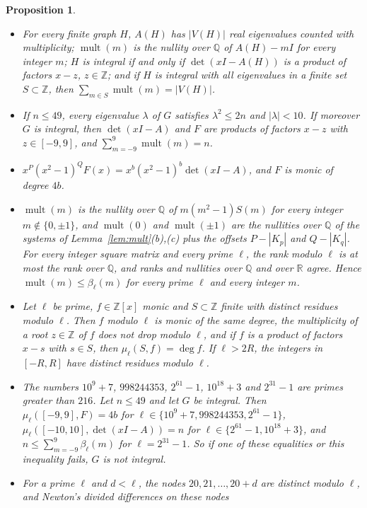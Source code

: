 \documentclass[11pt]{article}
\newtheorem{proposition}[lemma]{Proposition}
\theoremstyle{definition}
\theoremstyle{remark}
\DeclareMathOperator{\mult}{mult}
\newcommand{\Z}{\mathbb Z}
\newcommand{\R}{\mathbb R}
\newcommand{\Q}{\mathbb Q}
\begin{document}
\begin{proposition}\label{prop:tests}
\begin{itemize}
\item[(a)] For every finite graph $H$, $A(H)$ has $|V(H)|$ real eigenvalues
 counted with multiplicity; $\mult(m)$ is the nullity over $\Q$ of $A(H)-mI$
 for every integer $m$; $H$ is integral if and only if $\det(xI-A(H))$ is a
 product of factors $x-z$, $z\in\Z$; and if $H$ is integral with all
 eigenvalues in a finite set $S\subset\Z$, then $\sum_{m\in S}\mult(m)=|V(H)|$.
\item[(b)] If $n\le49$, every eigenvalue $\lambda$ of $G$ satisfies
 $\lambda^2\le2n$ and $|\lambda|<10$. If moreover $G$ is integral, then
 $\det(xI-A)$ and $F$ are products of factors $x-z$ with $z\in[-9,9]$, and
 $\sum_{m=-9}^{9}\mult(m)=n$.
\item[(c)] $x^P(x^2-1)^QF(x)=x^b(x^2-1)^b\det(xI-A)$, and $F$ is monic of degree
 $4b$.
\item[(d)] $\mult(m)$ is the nullity over $\Q$ of $m(m^2-1)S(m)$ for every
 integer $m\notin\{0,\pm1\}$, and $\mult(0)$ and $\mult(\pm1)$ are the
 nullities over $\Q$ of the systems of Lemma~\ref{lem:mult}(b),(c) plus the
 offsets $P-|K_p|$ and $Q-|K_q|$. For every integer square matrix and every
 prime $\ell$, the rank modulo $\ell$ is at most the rank over $\Q$, and ranks
 and nullities over $\Q$ and over $\R$ agree. Hence
 $\mult(m)\le\beta_\ell(m)$ for every prime $\ell$ and every integer $m$.
\item[(e)] Let $\ell$ be prime, $f\in\Z[x]$ monic and $S\subset\Z$ finite with
 distinct residues modulo $\ell$. Then $f$ modulo $\ell$ is monic of the same
 degree, the multiplicity of a root $z\in\Z$ of $f$ does not drop modulo
 $\ell$, and if $f$ is a product of factors $x-s$ with $s\in S$, then
 $\mu_\ell(S,f)=\deg f$. If $\ell>2R$, the integers in $[-R,R]$ have distinct
 residues modulo $\ell$.
\item[(f)] The numbers $10^9+7$, $998244353$, $2^{61}-1$, $10^{18}+3$ and
 $2^{31}-1$ are primes greater than $216$. Let $n\le49$ and let $G$ be
 integral. Then $\mu_\ell([-9,9],F)=4b$ for $\ell\in\{10^9+7,998244353,
 2^{61}-1\}$, $\mu_\ell([-10,10],\det(xI-A))=n$ for $\ell\in\{2^{61}-1,
 10^{18}+3\}$, and $n\le\sum_{m=-9}^{9}\beta_\ell(m)$ for $\ell=2^{31}-1$. So if
 one of these equalities or this inequality fails, $G$ is not integral.
\item[(g)] For a prime $\ell$ and $d<\ell$, the nodes $20,21,\dots,20+d$ are
 distinct modulo $\ell$, and Newton's divided differences on these nodes

\end{itemize}
\end{proposition}
\end{document}
